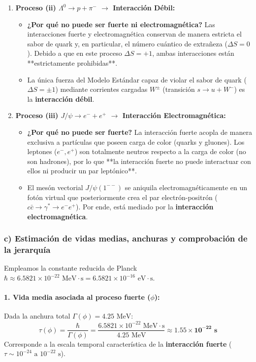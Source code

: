 \begin{problema}
\begin{enumerate}[label=\arabic*.]
    \item \textbf{Proceso (ii) $\Lambda^0 \rightarrow p + \pi^-$ $\longrightarrow$ Interacción Débil:}
    \begin{itemize}
        \item \textbf{¿Por qué no puede ser fuerte ni electromagnética?} Las interacciones fuerte y electromagnética conservan de manera estricta el sabor de quark y, en particular, el número cuántico de extrañeza ($\Delta S = 0$). Debido a que en este proceso $\Delta S = +1$, ambas interacciones están **estrictamente prohibidas**.
        \item La única fuerza del Modelo Estándar capaz de violar el sabor de quark ($\Delta S = \pm 1$) mediante corrientes cargadas $W^\pm$ (transición $s \to u + W^-$) es la \textbf{interacción débil}.
    \end{itemize}

    \item \textbf{Proceso (iii) $J/\psi \rightarrow e^- + e^+$ $\longrightarrow$ Interacción Electromagnética:}
    \begin{itemize}
        \item \textbf{¿Por qué no puede ser fuerte?} La interacción fuerte acopla de manera exclusiva a partículas que poseen carga de color (quarks y gluones). Los leptones ($e^-, e^+$) son totalmente neutros respecto a la carga de color (no son hadrones), por lo que **la interacción fuerte no puede interactuar con ellos ni producir un par leptónico**.
        \item El mesón vectorial $J/\psi(1^{--})$ se aniquila electromagnéticamente en un fotón virtual que posteriormente crea el par electrón-positrón ($c\bar{c} \to \gamma^* \to e^- e^+$). Por ende, está mediado por la \textbf{interacción electromagnética}.
    \end{itemize}
\end{enumerate}

\subsubsection*{c) Estimación de vidas medias, anchuras y comprobación de la jerarquía}

Empleamos la constante reducida de Planck $\hbar \approx 6.5821 \times 10^{-22}\text{ MeV}\cdot\text{s} = 6.5821 \times 10^{-16}\text{ eV}\cdot\text{s}$.

\paragraph{1. Vida media asociada al proceso fuerte ($\phi$):}
Dada la anchura total $\Gamma(\phi) = 4.25\text{ MeV}$:
\begin{equation*}
\tau(\phi) = \frac{\hbar}{\Gamma(\phi)} = \frac{6.5821 \times 10^{-22}\text{ MeV}\cdot\text{s}}{4.25\text{ MeV}} \approx \mathbf{1.55 \times 10^{-22}\text{ s}}
\end{equation*}
Corresponde a la escala temporal característica de la \textbf{interacción fuerte} ($\tau \sim 10^{-24}\text{ a } 10^{-22}\text{ s}$).


\end{problema}
